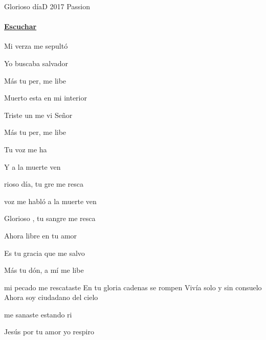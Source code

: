 \documentclass[12pt, spanish]{book}
\begin{document}
    \begin{song}{Glorioso día}{D}
    {2017} %
    {Passion}
    {} %
    {}
        \ifChordBk
            \paragraph{\mbox{}\hfill\protect\href{https://open.spotify.com/intl-es/track/0ksqrKoeNvywkfeqltzVQ3}{Escuchar}\mbox{}\hfill}
        \fi

        \begin{SBOpGroup}
            Mi verza me sepultó

            Yo buscaba  salvador

            Más tu per, me libe

            Muerto esta en mi interior

            Triste un  me vi Señor

            Más tu per, me libe
        \end{SBOpGroup}

        \begin{SBChorus}
            Tu voz me ha

            Y a la muerte ven

            rioso día, tu gre me resca

             voz me habló         a la muerte ven

            Glorioso , tu sangre me resca
        \end{SBChorus}

        \begin{SBOpGroup}
            Ahora libre  en tu amor

            Es tu gracia  que me salvo

            Más tu dón, a mí me libe
        \end{SBOpGroup}
        \vskip 20pt
        \begin{SBOpGroup}
             mi pecado me rescataste
            En tu gloria cadenas se rompen
            Vivía solo y sin consuelo
            Ahora soy ciudadano del cielo

             me sanaste estando ri

            Jesús por tu amor yo respiro


\end{SBOpGroup}
\end{song}
\end{document}
